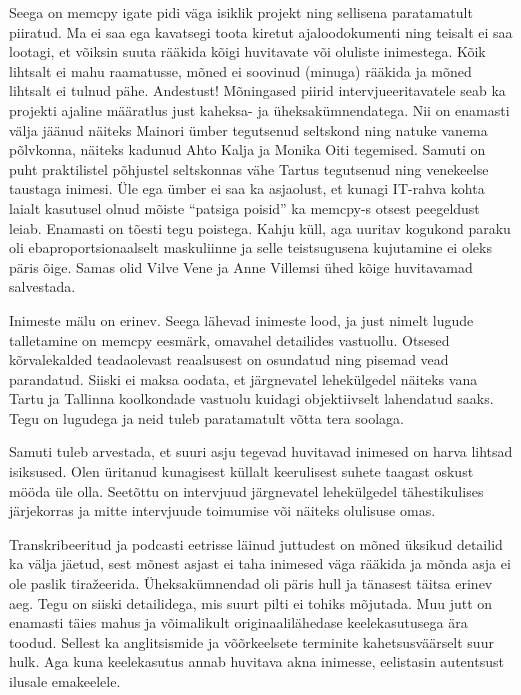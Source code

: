 Seega on memcpy igate pidi väga isiklik projekt ning sellisena paratamatult 
piiratud. Ma ei saa ega kavatsegi toota kiretut ajaloodokumenti ning teisalt ei saa lootagi, et võiksin suuta rääkida kõigi 
huvitavate või oluliste inimestega. Kõik lihtsalt ei mahu raamatusse, mõned ei 
soovinud (minuga) rääkida ja mõned lihtsalt ei tulnud pähe. Andestust! 
Mõningased piirid intervjueeritavatele seab ka projekti ajaline määratlus just 
kaheksa- ja üheksakümnendatega. Nii on enamasti välja jäänud näiteks 
Mainori ümber tegutsenud seltskond ning natuke vanema põlvkonna, 
näiteks kadunud Ahto Kalja ja Monika 
Oiti tegemised. Samuti on puht praktilistel põhjustel 
seltskonnas vähe Tartus tegutsenud ning venekeelse taustaga inimesi. Üle ega 
ümber ei saa ka asjaolust, et kunagi IT-rahva kohta laialt kasutusel olnud 
mõiste \enquote{patsiga poisid} ka memcpy-s otsest peegeldust leiab. Enamasti 
on tõesti tegu poistega. Kahju küll, aga uuritav kogukond paraku oli 
ebaproportsionaalselt maskuliinne ja selle teistsugusena kujutamine ei oleks 
päris õige. Samas olid Vilve Vene ja Anne 
Villemsi ühed kõige huvitavamad salvestada.

Inimeste mälu on erinev. Seega lähevad inimeste lood, ja just nimelt lugude 
talletamine on memcpy eesmärk, omavahel detailides vastuollu. Otsesed 
kõrvalekalded teadaolevast reaalsusest on osundatud ning pisemad vead 
parandatud. Siiski ei maksa oodata, et järgnevatel lehekülgedel näiteks vana 
Tartu ja Tallinna koolkondade vastuolu kuidagi objektiivselt lahendatud saaks. 
Tegu on lugudega ja neid tuleb paratamatult võtta tera soolaga.

Samuti tuleb arvestada, et suuri asju tegevad huvitavad inimesed on harva 
lihtsad isiksused. Olen üritanud kunagisest küllalt keerulisest suhete taagast 
oskust mööda üle olla. Seetõttu on intervjuud järgnevatel lehekülgedel 
tähestikulises järjekorras ja mitte intervjuude toimumise või näiteks olulisuse 
omas. 

Transkribeeritud ja podcasti eetrisse läinud juttudest on mõned üksikud 
detailid ka välja jäetud, sest mõnest asjast ei taha inimesed väga rääkida ja 
mõnda asja ei ole paslik tiražeerida. Üheksakümnendad oli päris hull ja 
tänasest täitsa erinev aeg. Tegu on siiski detailidega, mis suurt pilti ei 
tohiks mõjutada. Muu jutt on enamasti täies mahus ja võimalikult originaalilähedase keelekasutusega ära toodud. 
Sellest ka anglitsismide ja võõrkeelsete terminite kahetsusväärselt suur hulk. 
Aga kuna keelekasutus annab huvitava akna inimesse, eelistasin autentsust 
ilusale emakeelele.  

